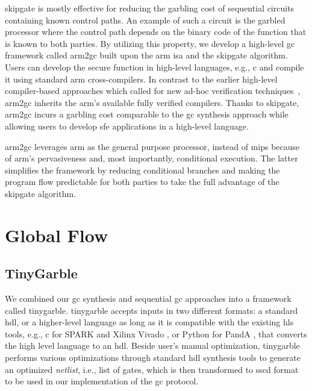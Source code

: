 \gls{skipgate} is mostly effective for reducing the garbling cost of sequential circuits containing known control paths.
An example of such a circuit is the garbled processor where the control path depends on the binary code of the function that is known to both parties.
By utilizing this property, we develop a high-level \acrshort{gc} framework called \gls{arm2gc} built upon the \gls{arm} \acrshort{isa} and the \gls{skipgate} algorithm.
Users can develop the secure function in high-level languages, e.g., \gls{c} and compile it using standard \gls{arm} cross-compilers.
In contrast to the earlier high-level compiler-based approaches which called for new ad-hoc verification techniques~\cite{rastogi2014wysteria,demmler2015aby,liu2015oblivm,mood2016frigate}, \gls{arm2gc} inherits the \gls{arm}'s available fully verified compilers.
Thanks to \gls{skipgate}, \gls{arm2gc} incurs a garbling cost comparable to the \acrshort{gc} synthesis approach while allowing users to develop \acrshort{sfe} applications in a high-level language.

\gls{arm2gc} leverages \gls{arm} as the general purpose processor, instead of \gls{mips} because of \gls{arm}'s pervasiveness and, most importantly, conditional execution.
The latter simplifies the framework by reducing conditional branches and making the program flow predictable for both parties to take the full advantage of the \gls{skipgate} algorithm.

\section{Global Flow}
\subsection{TinyGarble}
We combined our \acrshort{gc} synthesis and sequential \acrshort{gc} approaches into a framework called \gls{tinygarble}.
\gls{tinygarble} accepts inputs in two different formats: a standard \acrfull{hdl}, or a higher-level language as long as it is compatible with the existing \acrfull{hls} tools, e.g., \gls{c} for  SPARK \cite{Gupta2004} and Xilinx Vivado \cite{tool:Vivado}, or Python for PandA \cite{tool:PandA}, that converts the high level language to an \acrshort{hdl}.
Beside user's manual optimization, \gls{tinygarble} performs various optimizations through standard \acrshort{hdl} synthesis tools to generate an optimized \emph{netlist}, i.e., list of gates, which is then transformed to \acrfull{sscd} format to be used in our implementation of the \acrshort{gc} protocol.

